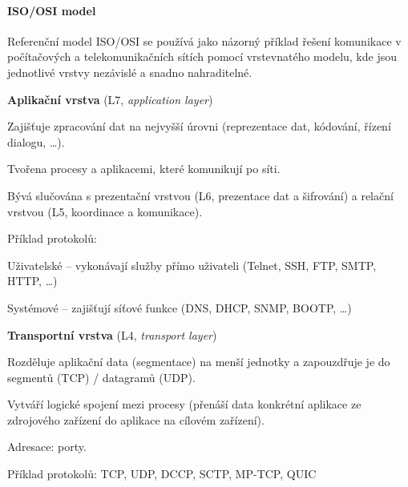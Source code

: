 \paragraph*{ISO/OSI model} Referenční model ISO/OSI se používá jako názorný příklad řešení komunikace v počítačových a telekomunikačních sítích pomocí vrstevnatého modelu, kde jsou jednotlivé vrstvy nezávislé a snadno nahraditelné. \begin{compactitem}

    \item \textbf{Aplikační vrstva} (L7, \textit{application layer}) \begin{compactitem}
        \item Zajišťuje zpracování dat na nejvyšší úrovni (reprezentace dat, kódování, řízení dialogu, \dots).
        \item Tvořena procesy a aplikacemi, které komunikují po síti.
        \item Bývá slučována s prezentační vrstvou (L6, prezentace dat a šifrování) a relační vrstvou (L5, koordinace a komunikace).
        \item Příklad protokolů: \begin{compactitem}
            \item Uživatelské -- vykonávají služby přímo uživateli (Telnet, SSH, FTP, SMTP, HTTP, \dots)
            \item Systémové -- zajišťují síťové funkce (DNS, DHCP, SNMP, BOOTP, \dots)
        \end{compactitem}
    \end{compactitem}

    \item \textbf{Transportní vrstva} (L4, \textit{transport layer}) \begin{compactitem}
        \item Rozděluje aplikační data (segmentace) na menší jednotky a zapouzdřuje je do segmentů (TCP) / datagramů (UDP).
        \item Vytváří logické spojení mezi procesy (přenáší data konkrétní aplikace ze zdrojového zařízení do aplikace na cílovém zařízení).
        \item Adresace: porty.
        \item Příklad protokolů: TCP, UDP, DCCP, SCTP, MP-TCP, QUIC
    \end{compactitem}


\end{compactitem}
